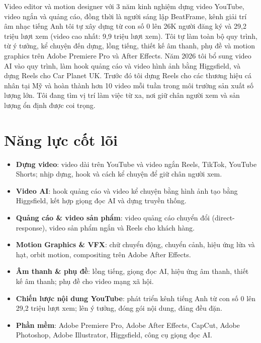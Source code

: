 \documentclass[11pt,a4paper,sans]{moderncv}
\begin{document}
\makecvtitle


\vspace{6pt}
\small{Video editor và motion designer với 3 năm kinh nghiệm dựng video YouTube, video ngắn và quảng cáo, đồng thời là người sáng lập BeatFrame, kênh giải trí âm nhạc tiếng Anh tôi tự xây dựng từ con số 0 lên 26K người đăng ký và 29,2 triệu lượt xem (video cao nhất: 9,9 triệu lượt xem). Tôi tự làm toàn bộ quy trình, từ ý tưởng, kể chuyện đến dựng, lồng tiếng, thiết kế âm thanh, phụ đề và motion graphics trên Adobe Premiere Pro và After Effects. Năm 2026 tôi bổ sung video AI vào quy trình, làm hook quảng cáo và video hình ảnh bằng Higgsfield, và dựng Reels cho Car Planet UK. Trước đó tôi dựng Reels cho các thương hiệu cá nhân tại Mỹ và hoàn thành hơn 10 video mỗi tuần trong môi trường sản xuất số lượng lớn. Tôi đang tìm vị trí làm việc từ xa, nơi giữ chân người xem và sản lượng ổn định được coi trọng.}


\section{Năng lực cốt lõi}
\vspace{1pt}
\begin{itemize}
\item \textbf{Dựng video}: video dài trên YouTube và video ngắn Reels, TikTok, YouTube Shorts; nhịp dựng, hook và cách kể chuyện để giữ chân người xem.
\item \textbf{Video AI}: hook quảng cáo và video kể chuyện bằng hình ảnh tạo bằng Higgsfield, kết hợp giọng đọc AI và dựng truyền thống.
\item \textbf{Quảng cáo \& video sản phẩm}: video quảng cáo chuyển đổi (direct-response), video sản phẩm ngắn và Reels cho khách hàng.
\item \textbf{Motion Graphics \& VFX}: chữ chuyển động, chuyển cảnh, hiệu ứng lửa và hạt, orbit motion, compositing trên Adobe After Effects.
\item \textbf{Âm thanh \& phụ đề}: lồng tiếng, giọng đọc AI, hiệu ứng âm thanh, thiết kế âm thanh; phụ đề cho video mạng xã hội.
\item \textbf{Chiến lược nội dung YouTube}: phát triển kênh tiếng Anh từ con số 0 lên 29,2 triệu lượt xem; lên ý tưởng, đóng gói nội dung, đăng đều đặn.
\item \textbf{Phần mềm}: Adobe Premiere Pro, Adobe After Effects, CapCut, Adobe Photoshop, Adobe Illustrator, Higgsfield, công cụ giọng đọc AI.
\end{itemize}
\end{document}
